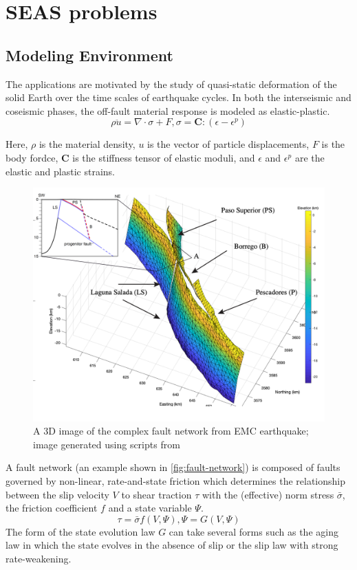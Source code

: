 \section{SEAS problems}
\subsection{Modeling Environment}
The applications are motivated by the study of quasi-static deformation of the solid Earth over the time scales of earthquake cycles.
In both the interseismic and coseismic phases, the off-fault material response is modeled as elastic-plastic.
\begin{equation}\label{eqn:governing}
    \rho \ddot{u} = \nabla \cdot \sigma + F, \sigma = \boldsymbol{C} : (\epsilon - \epsilon^p) 
\end{equation}

Here, $\rho$ is the material density, $u$ is the vector of particle displacements, $F$ is the body fordce, $\boldsymbol{C}$ is the stiffness tensor of elastic moduli, and $\epsilon$ and $\epsilon^p$ are the elastic and plastic strains.
\begin{figure}
    \centering
    \includegraphics[width=\linewidth]{figures/fault-network.png}
    \caption{A 3D image of the complex fault network from EMC earthquake; image generated using scripts from \cite{https://doi.org/10.1002/2016GL072289}}
    \label{fig:fault-network}
\end{figure}
A fault network (an example shown in \autoref{fig:fault-network}) is composed of faults governed by non-linear, rate-and-state friction which determines the relationship between the slip velocity $V$ to shear traction $\tau$ with the (effective) norm stress $\bar{\sigma}$, the friction coefficient $f$ and a state variable $\Psi$.
\begin{equation}\label{eqn:friction-law}
    \tau = \bar{\sigma} f(V,\Psi), \Psi = G(V, \Psi)
\end{equation}
The form of the state evolution law $G$ can take several forms such as the aging law in which the state evolves in the absence of slip or the slip law with strong rate-weakening.

